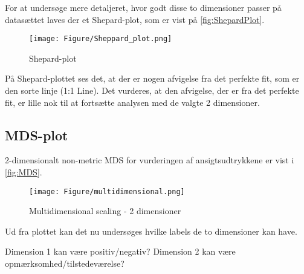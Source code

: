 For at undersøge mere detaljeret, hvor godt disse to dimensioner passer på datasættet laves der et Shepard-plot, som er vist på \autoref{fig:ShepardPlot}.

\begin{figure}[H]
\centering
\texttt{[image: Figure/Sheppard\_plot.png]} 
\caption{Shepard-plot}
\label{fig:ShepardPlot}
\end{figure}

\noindent På Shepard-plottet ses det, at der er nogen afvigelse fra det perfekte fit, som er den sorte linje (1:1 Line). Det vurderes, at den afvigelse, der er fra det perfekte fit, er lille nok til at fortsætte analysen med de valgte 2 dimensioner. 

\subsection*{MDS-plot}
2-dimensionalt non-metric MDS for vurderingen af ansigtsudtrykkene er vist i \autoref{fig:MDS}.  

\begin{figure}[H]
\centering
\texttt{[image: Figure/multidimensional.png]} 
\caption{Multidimensional scaling - 2 dimensioner}
\label{fig:MDS}
\end{figure}

\noindent Ud fra plottet kan det nu undersøges hvilke labels de to dimensioner kan have. 

Dimension 1 kan være positiv/negativ? 
Dimension 2 kan være opmærksomhed/tilstedeværelse? 